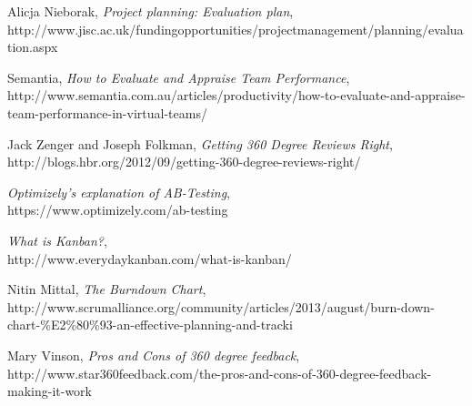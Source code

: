 \documentclass[10pt, a4paper]{article}
\begin{document}
\begin{thebibliography}{9}

  Alicja Nieborak, 
  \emph{Project planning: Evaluation plan},
  \\ http://www.jisc.ac.uk/fundingopportunities/projectmanagement/planning/evaluation.aspx
 
  Semantia, 
  \emph{How to Evaluate and Appraise Team Performance},
  \\ http://www.semantia.com.au/articles/productivity/how-to-evaluate-and-appraise-team-performance-in-virtual-teams/

  Jack Zenger and Joseph Folkman, 
  \emph{Getting 360 Degree Reviews Right}, 
  \\ http://blogs.hbr.org/2012/09/getting-360-degree-reviews-right/

  \emph{Optimizely’s explanation of AB-Testing},
  \\ https://www.optimizely.com/ab-testing

  \emph{What is Kanban?},
  \\ http://www.everydaykanban.com/what-is-kanban/
  
  Nitin Mittal, 
  \emph{The Burndown Chart}, 
  \\ http://www.scrumalliance.org/community/articles/2013/august/burn-down-chart-{\%}E2{\%}80{\%}93-an-effective-planning-and-tracki
  
  Mary Vinson, 
  \emph{Pros and Cons of 360 degree feedback}, 
  \\ http://www.star360feedback.com/the-pros-and-cons-of-360-degree-feedback-making-it-work

\end{thebibliography}
\end{document}
